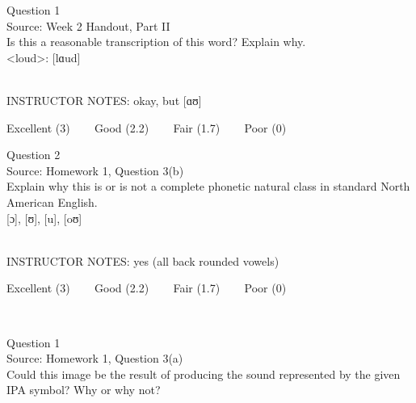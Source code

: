 \documentclass[12pt]{article}
\begin{document}
{\large Question 1}\\

Source: Week 2 Handout, Part II\\

Is this a reasonable transcription of this word? Explain why.\\

<loud>: {[lɑud]}


~\\
INSTRUCTOR NOTES: okay, but [ɑʊ]


\vfill
Excellent (3) ~~~ Good (2.2) ~~~ Fair (1.7) ~~~ Poor (0)
\newpage

{\large Question 2}\\

Source: Homework 1, Question 3(b)\\

Explain why this is or is not a complete phonetic natural class in standard North American English.\\

{[ɔ]}, {[ʊ]}, {[u]}, {[oʊ]}


~\\
INSTRUCTOR NOTES: yes (all back rounded vowels)


\vfill
Excellent (3) ~~~ Good (2.2) ~~~ Fair (1.7) ~~~ Poor (0)
\newpage

\begin{center}
\textbf{{\color{red}{\HUGE END OF EXAM}}}\\

\end{center}
\newpage

\begin{center}
\textbf{{\color{blue}{\HUGE START OF EXAM\\}}}

\textbf{{\color{blue}{\HUGE Student ID: 89289\\}}}

\textbf{{\color{blue}{\HUGE 4:40\\}}}

\end{center}
\newpage

{\large Question 1}\\

Source: Homework 1, Question 3(a)\\

Could this image be the result of producing the sound represented by the given IPA symbol? Why or why not?\\
\end{document}
